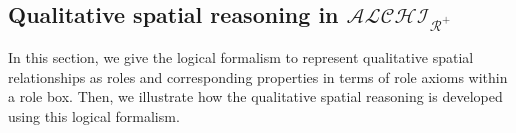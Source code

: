 \documentclass{article}
\begin{document}
\subsection{Qualitative spatial reasoning in $\mathcal{ALCHI_{R^+}}$}
In this section, we give the logical formalism to represent qualitative spatial relationships as roles and  corresponding properties in terms of role axioms within a role box.
Then, we illustrate how the qualitative spatial reasoning is developed using this logical formalism. 
\end{document}
